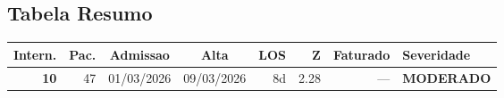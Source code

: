\documentclass[a4paper,10pt]{article}
\begin{document}
\subsection{Tabela Resumo}
\begin{center}
\begin{longtable}{>{\scriptsize}r>{\scriptsize}r>{\scriptsize}c>{\scriptsize}c>{\scriptsize}r>{\scriptsize}r>{\scriptsize}r>{\scriptsize}l}
\toprule
\textbf{Intern.} & \textbf{Pac.} & \textbf{Admissao} & \textbf{Alta} & \textbf{LOS} & \textbf{Z} & \textbf{Faturado} & \textbf{Severidade} \\
\midrule
\endhead
\bottomrule
\endfoot

\textcolor{anomyellow}{\textbf{10}} & 47 & 01/03/2026 & 09/03/2026 & 8d & \textcolor{anomyellow}{2.28} & --- & \textcolor{anomyellow}{\textbf{MODERADO}} \\

\end{longtable}\end{center}
\end{document}
